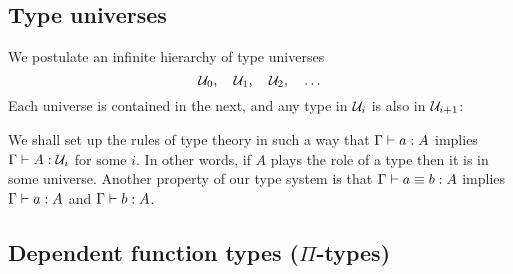 %
%

\subsection{Type universes}

%

We postulate an infinite hierarchy of type universes
%
\begin{equation*}
  \mathcal{U}_0, \quad \mathcal{U}_1, \quad  \mathcal{U}_2, \quad \ldots
\end{equation*}
%
Each universe is contained in the next, and any type in $\mathcal{U}_i$ is also in $\mathcal{U}_{i+1}$:
%
%
We shall set up the rules of type theory in such a way that $\Gamma \vdash a : A$
implies $\Gamma \vdash A : \mathcal{U}_i$ for some $i$. In other words, if $A$ plays the role of a type then it is in some universe. Another property of our type system is that $\Gamma \vdash a \equiv b : A$
implies $\Gamma \vdash a : A$ and $\Gamma \vdash b : A$.

\subsection{Dependent function types (\texorpdfstring{$\Pi$}{Π}-types)}
\label{sec:more-formal-pi}

%
%

